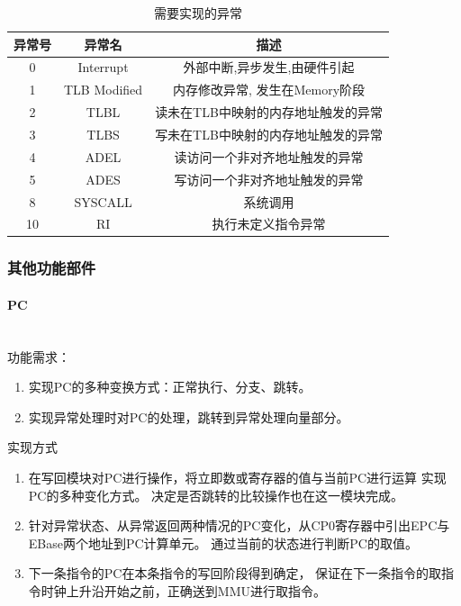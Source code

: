             \begin{table}
            \centering
            \caption{需要实现的异常}
            \begin{tabular}{|c|c|c|}
            \hline
            异常号 & 异常名 & 描述 \\
            \hline
            0 & Interrupt & 外部中断,异步发生,由硬件引起 \\
            \hline
            1 & TLB Modified & 内存修改异常, 发生在Memory阶段 \\
            \hline
            2 & TLBL & 读未在TLB中映射的内存地址触发的异常 \\
            \hline
            3 & TLBS & 写未在TLB中映射的内存地址触发的异常 \\
            \hline
            4 & ADEL & 读访问一个非对齐地址触发的异常 \\
            \hline
            5 & ADES & 写访问一个非对齐地址触发的异常 \\
            \hline
            8 & SYSCALL & 系统调用 \\
            \hline
            10 & RI & 执行未定义指令异常 \\
            \hline
            \end{tabular}
            \end{table}

        \subsubsection{其他功能部件}
            \paragraph{PC}
                \mbox{} \\ 

                功能需求：
                \begin{enumerate}
                \item
                实现PC的多种变换方式：正常执行、分支、跳转。
                \item
                实现异常处理时对PC的处理，跳转到异常处理向量部分。
                \end{enumerate}

                实现方式
                \begin{enumerate}
                \item
                在写回模块对PC进行操作，将立即数或寄存器的值与当前PC进行运算%
                实现PC的多种变化方式。%
                决定是否跳转的比较操作也在这一模块完成。
                \item
                针对异常状态、从异常返回两种情况的PC变化，从CP0寄存器中引出EPC与EBase两个地址到PC计算单元。
                通过当前的状态进行判断PC的取值。
                \item
                下一条指令的PC在本条指令的写回阶段得到确定，
                保证在下一条指令的取指令时钟上升沿开始之前，正确送到MMU进行取指令。
                \end{enumerate}


